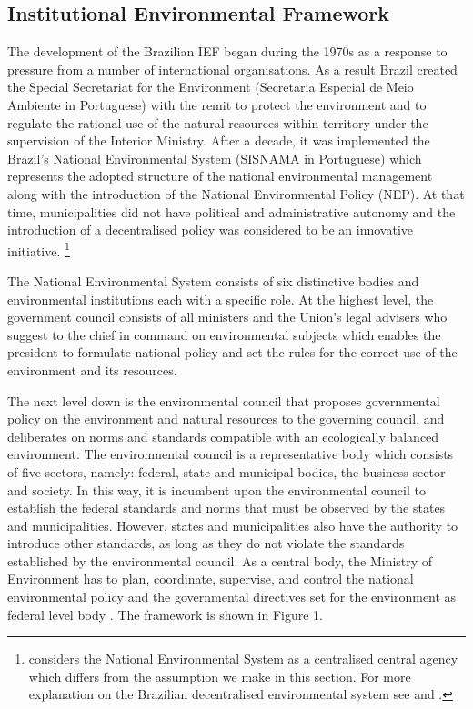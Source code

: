 
\subsection{Institutional Environmental Framework}

The development of the Brazilian IEF began during the 1970s as a response to pressure from a number of international organisations. As a result Brazil created the Special Secretariat for the Environment (Secretaria Especial de Meio Ambiente in Portuguese) with the remit to protect the environment and to regulate the rational use of the natural resources within territory under the supervision of the Interior Ministry. After a decade, it was implemented the Brazil's National Environmental System (SISNAMA in Portuguese) which represents the adopted structure of the national environmental management along with the introduction of the National Environmental Policy (NEP). At that time, municipalities did not have political and administrative autonomy and the introduction of a decentralised policy was considered to be an innovative initiative. \footnote{\citet{pailler_2018} considers the National Environmental System as a centralised central agency which differs from the assumption we make in this section. For more explanation on the Brazilian decentralised environmental system see \citet{SCARDUA2003} and \citet{SANCHES2017}.}

The National Environmental System consists of six distinctive bodies and environmental institutions each with a specific role. At the highest level, the government council consists of all ministers and the Union's legal advisers who suggest to the chief in command on environmental subjects which enables the president to formulate national policy and set the rules for the correct use of the environment and its resources.

The next level down is the environmental council that proposes governmental policy on the environment and natural resources to the governing council, and deliberates on norms and standards compatible with an ecologically balanced environment. The environmental council is a representative body which consists of five sectors, namely: federal, state and municipal bodies, the business sector and society. In this way, it is incumbent upon the environmental council to establish the federal standards and norms that must be observed by the states and municipalities. However, states and municipalities also have the authority to introduce other standards, as long as they do not violate the standards established by the environmental council. As a central body, the Ministry of Environment has to plan, coordinate, supervise, and control the national environmental policy and the governmental directives set for the environment as federal level body \citep{MENDESJUSBRASIL}. The framework is shown in Figure 1.



